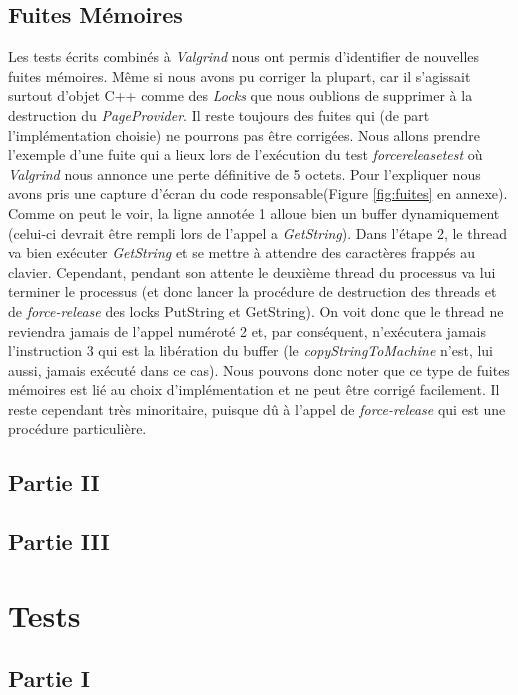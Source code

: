 \documentclass{article}
\begin{document}
\subsection{Fuites Mémoires}
Les tests écrits combinés à \textit{Valgrind} nous ont permis d'identifier de nouvelles fuites mémoires. Même si nous avons pu corriger la plupart, car il s'agissait
surtout d'objet C++ comme des \textit{Locks} que nous oublions de supprimer à la destruction du \textit{PageProvider}. Il reste toujours des fuites qui
(de part l'implémentation choisie) ne pourrons pas être corrigées. Nous allons prendre l'exemple d'une fuite qui a lieux lors de l'exécution du test \textit{forcereleasetest} où
\textit{Valgrind} nous annonce une perte définitive de 5 octets. Pour l'expliquer nous avons pris une capture d'écran du code responsable(Figure \ref{fig:fuites} en annexe).
Comme on peut le voir, la ligne annotée 1 alloue bien un buffer dynamiquement (celui-ci devrait être rempli lors de l'appel a \textit{GetString}). Dans l'étape 2, le thread va bien
exécuter \textit{GetString} et se mettre à attendre des caractères frappés au clavier. Cependant, pendant son attente le deuxième thread du processus va lui terminer le processus 
(et donc lancer la procédure de destruction des threads et de \textit{force-release} des locks PutString et GetString). On voit donc que le thread ne reviendra jamais de l'appel
numéroté 2 et, par conséquent, n'exécutera jamais l'instruction 3 qui est la libération du buffer (le \textit{copyStringToMachine} n'est, lui aussi, jamais exécuté dans ce cas).
Nous pouvons donc noter que ce type de fuites mémoires est lié au choix d'implémentation et ne peut être corrigé facilement. Il reste cependant très minoritaire, puisque dû à l'appel
de \textit{force-release} qui est une procédure particulière.
\subsection{Partie II}

\subsection{Partie III}


\section{Tests}
\subsection{Partie I}
\end{document}
